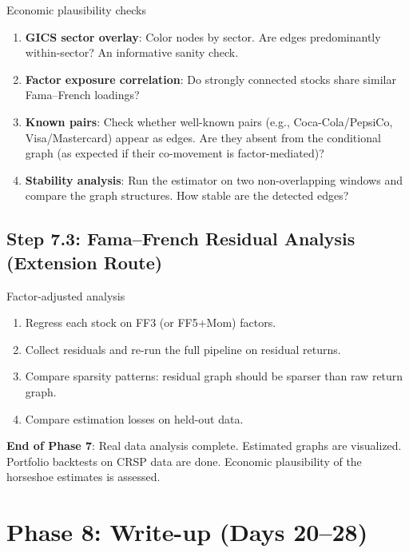 \documentclass[11pt,a4paper]{article}
\begin{document}
\begin{action}{Economic plausibility checks}
\begin{enumerate}
  \item \textbf{GICS sector overlay}: Color nodes by sector. Are edges predominantly within-sector? An informative sanity check.
  \item \textbf{Factor exposure correlation}: Do strongly connected stocks share similar Fama--French loadings?
  \item \textbf{Known pairs}: Check whether well-known pairs (e.g., Coca-Cola/PepsiCo, Visa/Mastercard) appear as edges. Are they absent from the conditional graph (as expected if their co-movement is factor-mediated)?
  \item \textbf{Stability analysis}: Run the estimator on two non-overlapping windows and compare the graph structures. How stable are the detected edges?
\end{enumerate}
\end{action}

\subsection{Step 7.3: Fama--French Residual Analysis (Extension Route)}

\begin{action}{Factor-adjusted analysis}
\begin{enumerate}
  \item Regress each stock on FF3 (or FF5+Mom) factors.
  \item Collect residuals and re-run the full pipeline on residual returns.
  \item Compare sparsity patterns: residual graph should be sparser than raw return graph.
  \item Compare estimation losses on held-out data.
\end{enumerate}
\end{action}

\begin{milestone}
\textbf{End of Phase 7}: Real data analysis complete. Estimated graphs are visualized. Portfolio backtests on CRSP data are done. Economic plausibility of the horseshoe estimates is assessed.
\end{milestone}


\section{Phase 8: Write-up (Days 20--28)}\label{sec:phase8}
\end{document}
